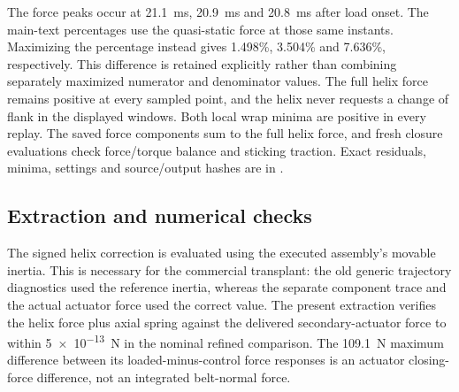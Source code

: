 \documentclass[11pt]{report}
\numberwithin{equation}{section}
\begin{document}
The force peaks occur at \SI{21.1}{ms}, \SI{20.9}{ms} and \SI{20.8}{ms}
after load onset. The main-text percentages use the quasi-static force at
those same instants. Maximizing the percentage instead gives
\num{1.498}\%, \num{3.504}\% and \num{7.636}\%, respectively.
This difference is retained explicitly rather than combining separately
maximized numerator and denominator values. The full helix force remains positive at
every sampled point, and the helix never requests a change of flank in the
displayed windows. Both local wrap minima are positive in every replay.
The saved force components sum to the full helix force, and fresh
closure evaluations check force/torque balance and sticking traction.
Exact residuals, minima, settings and source/output hashes are in
.

\subsection{Extraction and numerical checks}

The signed helix correction is evaluated using the executed assembly's
movable inertia. This is necessary for the commercial transplant: the old
generic trajectory diagnostics used the reference inertia, whereas the
separate component trace and the actual actuator force used the correct
value. The present extraction verifies the helix force plus axial spring
against the delivered secondary-actuator force to within
\SI{5e-13}{N} in the nominal refined comparison. The \SI{109.1}{N}
maximum difference between its loaded-minus-control force responses is an
actuator closing-force difference, not an integrated belt-normal force.
\end{document}
